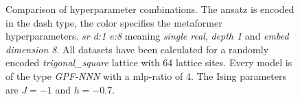 \begin{figure}[htbp]
    \caption{Comparison of hyperparameter combinations. 
            The ansatz is encoded in the dash type, the color specifies the metaformer hyperparameters.
            \emph{sr d:1 e:8} meaning \emph{single real}, \emph{depth 1} and \emph{embed dimension 8}.
            All datasets have been calculated for a randomly encoded \emph{trigonal\_square} lattice with 64 lattice sites.
            Every model is of the type \emph{GPF-NNN} with a mlp-ratio of 4. The Ising parameters are $J=-1$ and $h=-0.7$.
    }
    \label{fig:hyperparameter-matrix}
\end{figure}
